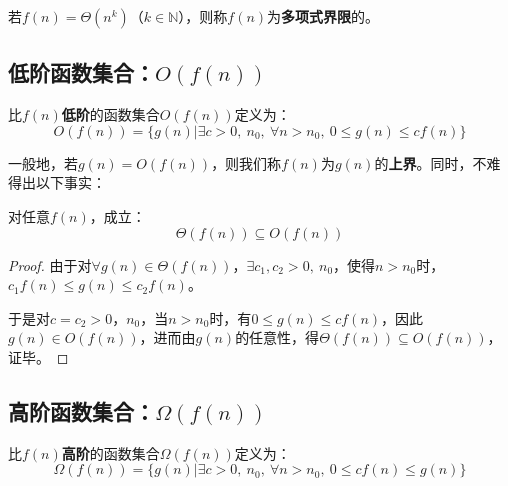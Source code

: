 \documentclass[12pt,a4paper,violet]{bbe}
\begin{document}
	若$f(n)=\Theta(n^k)$（$k\in\mathbb{N}$），则称$f(n)$为\textbf{多项式界限}的。

\subsection{低阶函数集合：$O(f(n))$}
\begin{definition}
	比$f(n)$\textbf{低阶}的函数集合$O(f(n))$定义为：
	$$
	O(f(n))=\{g(n)|\exists c>0,~n_0,~\forall n>n_0,~0\leqslant g(n)\leqslant cf(n)\}
	$$
\end{definition}
一般地，若$g(n)=O(f(n))$，则我们称$f(n)$为$g(n)$的\textbf{上界}。同时，不难得出以下事实：
\begin{theorem}
	对任意$f(n)$，成立：
	$$
	\Theta(f(n))\subseteq O(f(n))
	$$
\end{theorem}
\begin{proof}
	由于对$\forall g(n)\in\Theta(f(n))$，$\exists c_1,c_2>0,~n_0$，使得$n>n_0$时，$c_1f(n)\leqslant g(n)\leqslant c_2f(n)$。
	
	于是对$c=c_2>0$，$n_0$，当$n>n_0$时，有$0\leqslant g(n)\leqslant cf(n)$，因此$g(n)\in O(f(n))$，进而由$g(n)$的任意性，得$\Theta(f(n))\subseteq O(f(n))$，证毕。
\end{proof}

\subsection{高阶函数集合：$\Omega(f(n))$}
\begin{definition}
	比$f(n)$\textbf{高阶}的函数集合$\Omega(f(n))$定义为：
	$$
	\Omega(f(n))=\{g(n)|\exists c>0,~n_0,~\forall n>n_0,~ 0\leqslant cf(n)\leqslant g(n)\}
	$$
\end{definition}
\end{document}
